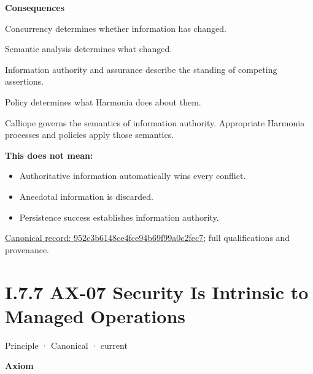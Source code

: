 \par\medskip\textbf{Consequences}\par


Concurrency determines whether information has changed.



Semantic analysis determines what changed.



Information authority and assurance describe the standing of competing
assertions.



Policy determines what Harmonia does about them.



Calliope governs the semantics of information authority. Appropriate
Harmonia processes and policies apply those semantics.



\textbf{This does not mean:}



\begin{itemize}


\item Authoritative information automatically wins every conflict.

\item Anecdotal information is discarded.

\item Persistence success establishes information authority.

\end{itemize}

{\footnotesize \href{../../../../continuum/motivation/principle/952c3b6148ce4fce94b69f99a0c2fec7.md}{Canonical record: 952c3b6148ce4fce94b69f99a0c2fec7}; full qualifications and provenance.}\par
\section*{I.7.7 AX-07 Security Is Intrinsic to Managed Operations}
\label{navigation:I.7.7}

\label{element:5de2ae2c3b794c2d9f3a14efd51d564f}
{\small Principle · Canonical · current}\par

\par\medskip\textbf{Axiom}\par


